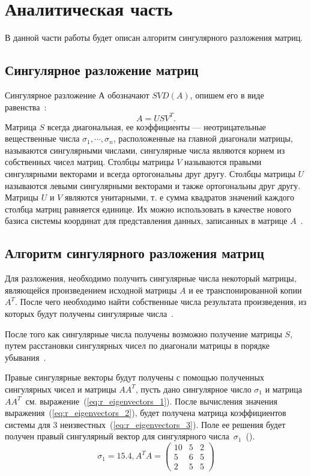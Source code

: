 \chapter{Аналитическая часть}
В данной части работы будет описан алгоритм сингулярного разложения матриц.






\section{Сингулярное разложение матриц}
Сингулярное разложение $А$ обозначают
$SVD(A)$, опишем его в виде равенства~\cite{SVD}:
\begin{equation}
	A = USV^{T}.
	\label{eq:SVD_def}
\end{equation}
Матрица $S$ всегда диагональная, ее коэффициенты –-- неотрицательные вещественные числа $\sigma_{1}, \cdots, \sigma_{n}$, расположенные на главной диагонали матрицы, называются сингулярными числами, сингулярные числа являются корнем из собственных чисел матриц. Столбцы матрицы $V$ называются правыми сингулярными векторами и всегда ортогональны 
друг другу. Столбцы матрицы $U$ называются левыми сингулярными векторами и также ортогональны друг другу. Матрицы $U$ и $V$ являются унитарными, т. е сумма квадратов значений каждого столбца матриц равняется единице. Их можно использовать в качестве нового базиса системы координат для представления данных, записанных в матрице $A$~\cite{SVD}.

\section{Алгоритм сингулярного разложения матриц}
Для разложения, необходимо получить сингулярные числа некоторый матрицы, являющейся  произведением исходной матрицы $A$ и ее транспонированной копии $A^{T}$. После чего необходимо найти собственные числа результата произведения, из которых будут получены сингулярные числа~\cite{SVD,pers_val}.

После того как сингулярные числа получены возможно получение матрицы $S$, путем расстановки сингулярных чисел по диагонали матрицы в порядке убывания~\cite{SVD_algo}.

Правые сингулярные векторы будут получены с помощью полученных сингулярных чисел и матрицы $AA^{T}$, пусть дано сингулярное число $\sigma_{1}$ и матрица $AA^{T}$~см. выражение~(\ref{eq:r_eigenvectors_1}). После вычисления значения выражения~(\ref{eq:r_eigenvectors_2}), будет получена матрица коэффициентов системы для 3 неизвестных~(\ref{eq:r_eigenvectors_3}). Поле ее решения будет получен правый сингулярный вектор для сингулярного числа~$\sigma_{1}$~(\cite{SVD_algo}).
\begin{equation}
	\sigma_{1}=15.4, A^{T}A=\begin{pmatrix}
	10 & 5 & 2\\ 
	5 & 6  &5\\
		2 & 5 & 5
	\end{pmatrix}
	\label{eq:r_eigenvectors_1}
\end{equation}


